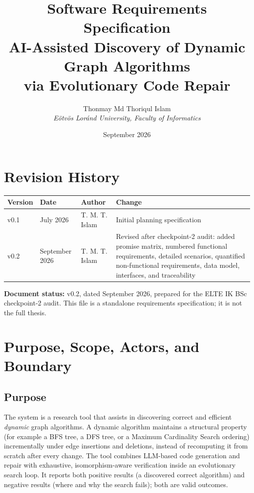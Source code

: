 \documentclass[12pt,a4paper]{article}
\title{Software Requirements Specification\\[2pt]
\large AI-Assisted Discovery of Dynamic Graph Algorithms\\ via Evolutionary Code Repair}
\author{Thonmay Md Thoriqul Islam\\
\textit{E\"otv\"os Lor\'and University, Faculty of Informatics}}
\date{September 2026}
\begin{document}
\maketitle

\section*{Revision History}
\begin{center}
\begin{tabular}{@{}llll@{}}
\toprule
\textbf{Version} & \textbf{Date} & \textbf{Author} & \textbf{Change} \\
\midrule
v0.1 & July 2026 & T. M. T. Islam & Initial planning specification \\
v0.2 & September 2026 & T. M. T. Islam & Revised after checkpoint-2 audit: added promise matrix, numbered functional requirements, detailed scenarios, quantified non-functional requirements, data model, interfaces, and traceability \\
\bottomrule
\end{tabular}
\end{center}

\noindent\textbf{Document status:} v0.2, dated September 2026, prepared for the ELTE IK BSc checkpoint-2 audit. This file is a standalone requirements specification; it is not the full thesis.

\section{Purpose, Scope, Actors, and Boundary}

\subsection{Purpose}

The system is a research tool that assists in discovering correct and efficient \emph{dynamic} graph algorithms. A dynamic algorithm maintains a structural property (for example a BFS tree, a DFS tree, or a Maximum Cardinality Search ordering) incrementally under edge insertions and deletions, instead of recomputing it from scratch after every change. The tool combines LLM-based code generation and repair with exhaustive, isomorphism-aware verification inside an evolutionary search loop. It reports both positive results (a discovered correct algorithm) and negative results (where and why the search fails); both are valid outcomes.
\end{document}
